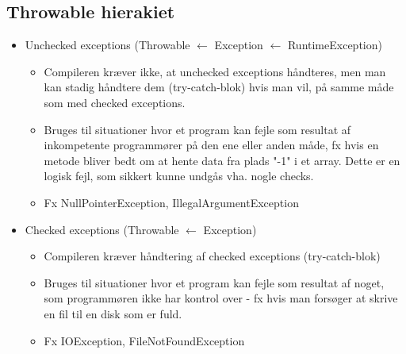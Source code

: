 \subsection{Throwable hierakiet}
\begin{itemize}
  \item Unchecked exceptions (Throwable $\leftarrow$ Exception $\leftarrow$ RuntimeException)
  \begin{itemize}
    \item Compileren kræver ikke, at unchecked exceptions håndteres, men man kan stadig håndtere dem (try-catch-blok) hvis man vil, på samme måde som med checked exceptions.
    \item Bruges til situationer hvor et program kan fejle som resultat af inkompetente programmører på den ene eller anden måde, fx hvis en metode bliver bedt om at hente data fra plads "-1" i et array. Dette er en logisk fejl, som sikkert kunne undgås vha. nogle checks.
    \item Fx NullPointerException, IllegalArgumentException
  \end{itemize}
  \item Checked exceptions (Throwable $\leftarrow$ Exception)
  \begin{itemize}
    \item Compileren kræver håndtering af checked exceptions (try-catch-blok)
    \item Bruges til situationer hvor et program kan fejle som resultat af noget, som programmøren ikke har kontrol over - fx hvis man forsøger at skrive en fil til en disk som er fuld.
    \item Fx IOException, FileNotFoundException
  \end{itemize}
\end{itemize}

